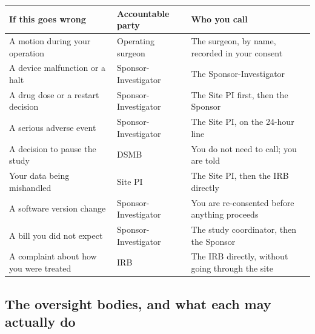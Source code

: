
\vspace{0.30em}

\noindent\begin{tabularx}{\textwidth}{L{4.6cm} L{3.7cm} Y}
\toprule
\textbf{If this goes wrong} & \textbf{Accountable party} & \textbf{Who you call} \\
\midrule
A motion during your operation & Operating surgeon & The surgeon, by name, recorded in your consent \\
A device malfunction or a halt & Sponsor-Investigator & The Sponsor-Investigator \\
A drug dose or a restart decision & Sponsor-Investigator & The Site PI first, then the Sponsor \\
A serious adverse event & Sponsor-Investigator & The Site PI, on the 24-hour line \\
A decision to pause the study & DSMB & You do not need to call; you are told \\
Your data being mishandled & Site PI & The Site PI, then the IRB directly \\
A software version change & Sponsor-Investigator & You are re-consented before anything proceeds \\
A bill you did not expect & Sponsor-Investigator & The study coordinator, then the Sponsor \\
A complaint about how you were treated & IRB & The IRB directly, without going through the site \\
\bottomrule
\end{tabularx}

\vspace{0.30em}

\subsection{The oversight bodies, and what each may actually do}


